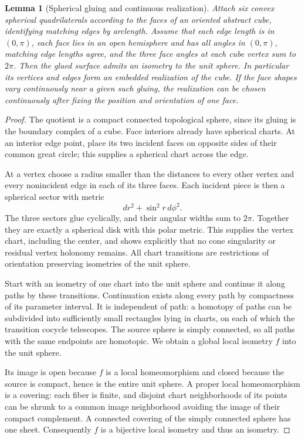 \documentclass[12pt,reqno]{amsart}
\newtheorem{lemma}[theorem]{Lemma}
\theoremstyle{definition}
\numberwithin{equation}{section}
\begin{document}
\begin{lemma}[Spherical gluing and continuous realization]
\label{r3:topology-spherical-gluing}
Attach six convex spherical quadrilaterals according to the faces of
an oriented abstract cube, identifying matching edges by arclength.
Assume that each edge length is in $(0,\pi)$, each face lies in an
open hemisphere and has all angles in $(0,\pi)$, matching edge
lengths agree, and the three face angles at each cube vertex sum to
$2\pi$. Then the glued surface admits an isometry to the unit sphere.
In particular its vertices and edges form an embedded realization of
the cube. If the face shapes vary continuously near a given such
gluing, the realization can be chosen continuously after fixing the
position and orientation of one face.
\end{lemma}
\begin{proof}
The quotient is a compact connected topological sphere, since its
gluing is the boundary complex of a cube. Face interiors already have
spherical charts. At an interior edge point, place its two incident
faces on opposite sides of their common great circle; this supplies
a spherical chart across the edge.

At a vertex choose a radius smaller than the distances to every
other vertex and every nonincident edge in each of its three faces.
Each incident piece is then a spherical sector with metric
\[
 dr^2+\sin^2r\,d\phi^2.
\]
The three sectors glue cyclically, and their angular widths sum to
$2\pi$. Together they are exactly a spherical disk with this polar
metric. This supplies the vertex chart, including the center, and
shows explicitly that no cone singularity or residual vertex holonomy
remains. All chart transitions are restrictions of orientation
preserving isometries of the unit sphere.

Start with an isometry of one chart into the unit sphere and continue
it along paths by these transitions. Continuation exists along every
path by compactness of its parameter interval. It is independent of
path: a homotopy of paths can be subdivided into sufficiently small
rectangles lying in charts, on each of which the transition cocycle
telescopes. The source sphere is simply connected, so all paths with
the same endpoints are homotopic. We obtain a global local isometry
$f$ into the unit sphere.

Its image is open because $f$ is a local homeomorphism and closed
because the source is compact, hence is the entire unit sphere. A
proper local homeomorphism is a covering: each fiber is finite, and
disjoint chart neighborhoods of its points can be shrunk to a common
image neighborhood avoiding the image of their compact complement.
A connected covering of the simply connected sphere has one sheet.
Consequently $f$ is a bijective local isometry and thus an isometry.


\end{proof}
\end{document}
